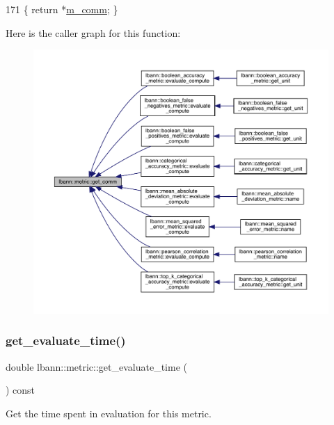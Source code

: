 \begin{DoxyCode}
171 \{ \textcolor{keywordflow}{return} *\hyperlink{classlbann_1_1metric_a547077709911e30c7d070545936c9c85}{m\_comm}; \}
\end{DoxyCode}
Here is the caller graph for this function\+:\nopagebreak
\begin{figure}[H]
\begin{center}
\leavevmode
\includegraphics[width=350pt]{classlbann_1_1metric_a464120720df6bfdf91bffe353e562964_icgraph}
\end{center}
\end{figure}
\mbox{\label{classlbann_1_1metric_a686239cad1f25628c9b298f9233cc9f3}} 
\subsubsection{\texorpdfstring{get\+\_\+evaluate\+\_\+time()}{get\_evaluate\_time()}}
{\footnotesize\ttfamily double lbann\+::metric\+::get\+\_\+evaluate\+\_\+time (\begin{DoxyParamCaption}{ }\end{DoxyParamCaption}) const\hspace{0.3cm}{\ttfamily [inline]}}

Get the time spent in evaluation for this metric. 

